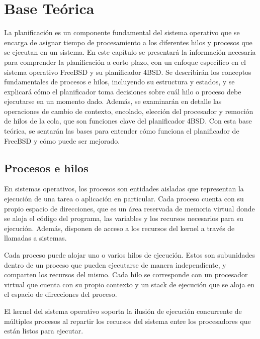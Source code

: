 \section{Base Teórica}

La planificación es un componente fundamental del sistema operativo que se encarga de asignar tiempo de procesamiento a los diferentes hilos y procesos que se ejecutan en un sistema. En este capítulo se presentará la información necesaria para comprender la planificación a corto plazo, con un enfoque específico en el sistema operativo FreeBSD y su planificador 4BSD. Se describirán los conceptos fundamentales de procesos e hilos, incluyendo su estructura y estados, y se explicará cómo el planificador toma decisiones sobre cuál hilo o proceso debe ejecutarse en un momento dado. Además, se examinarán en detalle las operaciones de cambio de contexto, encolado, elección del procesador y remoción de hilos de la cola, que son funciones clave del planificador 4BSD. Con esta base teórica, se sentarán las bases para entender cómo funciona el planificador de FreeBSD y cómo puede ser mejorado.


\subsection{Procesos e hilos}

En sistemas operativos, los procesos son entidades aisladas que representan la ejecución de una tarea o aplicación en particular. Cada proceso cuenta con su propio espacio de direcciones, que es un área reservada de memoria virtual donde se aloja el código del programa, las variables y los recursos necesarios para su ejecución. Además, disponen de acceso a los recursos del kernel a través de llamadas a sistemas.\par

Cada proceso puede alojar uno o varios hilos de ejecución. Estos son subunidades dentro de un proceso que pueden ejecutarse de manera independiente, y comparten los recursos del mismo. Cada hilo se corresponde con un procesador virtual que cuenta con su propio contexto y un stack de ejecución que se aloja en el espacio de direcciones del proceso.\par

El kernel del sistema operativo soporta la ilusión de ejecución concurrente de múltiples procesos al repartir los recursos del sistema entre los procesadores que están listos para ejecutar.\par

